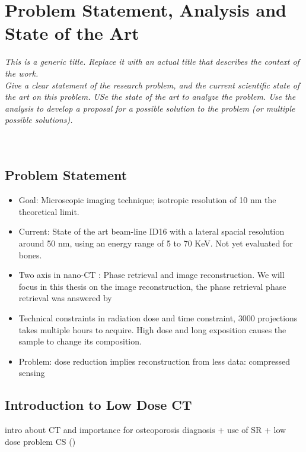 \chapter{Problem Statement, Analysis and State of the Art}
\textit{This is a generic title. Replace it with an actual title that describes the context of the work. \\
Give a clear statement of the research problem, and the current scientific state of the art on this problem.  USe the state of the art to analyze the problem.  Use the analysis to develop a proposal for a possible solution to the problem (or multiple possible solutions).}\\
\\
\\
\section{Problem Statement}
\begin{itemize}
	\item 	Goal: Microscopic imaging technique; isotropic resolution of 10 nm the theoretical limit. 
	\item   Current: State of the art beam-line ID16 \cite{martinez2016id16b} with a lateral spacial resolution around 50 nm, using an energy range of  5 to 70 KeV. Not yet evaluated for bones.
	\item   Two axis in nano-CT : Phase retrieval and image reconstruction. We will focus in this thesis on the image reconstruction, the phase retrieval phase retrieval was answered by \cite{langer2008phase}
	\item 	Technical constraints in radiation dose and time constraint, 3000 projections takes multiple hours to acquire. High dose and long exposition causes the sample to change its composition. 
	\item 	Problem: dose reduction implies reconstruction from less data: compressed sensing
\end{itemize}

\section{Introduction to Low Dose CT}


	intro about CT and importance for osteoporosis diagnosis + use of SR + low dose problem CS (\cite{[24], [25], [26]})


